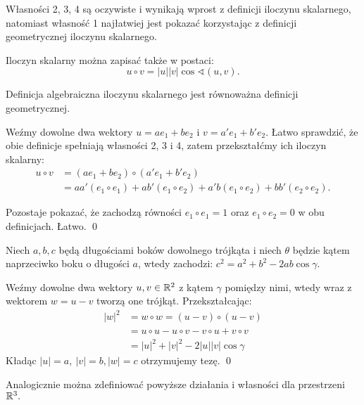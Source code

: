 Własności 2, 3, 4 są oczywiste i wynikają wprost z definicji iloczynu skalarnego, natomiast własność 1 najłatwiej jest
pokazać korzystając z definicji geometrycznej iloczynu skalarnego.
    
\begin{df}[geometryczna] 
Iloczyn skalarny można zapisać także w postaci: $$u \circ v = |u||v|\cos\sphericalangle(u, v).$$ \end{df}
    
\begin{tw} Definicja algebraiczna iloczynu skalarnego jest równoważna definicji geometrycznej. \end{tw}
    
\begin{dd}
    Weźmy dowolne dwa wektory $u = ae_1 + be_2$ i $v = a'e_1 + b'e_2$. Łatwo sprawdzić, że obie definicje spełniają
    własności 2, 3 i 4, zatem przekształćmy ich iloczyn skalarny:
    \begin{align*}u \circ v &= (ae_1 + be_2) \circ (a'e_1 + b'e_2) \\
                            &= aa'(e_1 \circ e_1) + ab'(e_1 \circ e_2) + 
                               a'b(e_1 \circ e_2) + bb'(e_2 \circ e_2).
    \end{align*}
    
    Pozostaje pokazać, że zachodzą równości $e_1 \circ e_1 = 1$ oraz $e_1 \circ e_2 = 0$ w obu definicjach. Łatwo. \qed
\end{dd}
    
\begin{tw}[cosinusów]
Niech $a,b,c$ będą długościami boków dowolnego trójkąta i niech $\theta$ będzie kątem naprzeciwko boku o długości $a$, wtedy zachodzi: $c^2 = a^2 + b^2 - 2ab\cos\gamma.$
\end{tw}
    
\begin{dd}
Weźmy dowolne dwa wektory $u,v\in\mathbb{R}^2$ z kątem $\gamma$ pomiędzy nimi, wtedy wraz z wektorem $w=u-v$ tworzą one trójkąt. Przekształcając: 
\begin{align*} |w|^2 &= w \circ w = (u-v)\circ(u-v) \\ 
                &= u \circ u - u \circ v - v \circ u + v \circ v \\ 
                &= |u|^2 + |v|^2 - 2|u||v|\cos\gamma 
\end{align*}
Kładąc $|u|=a,\ |v|=b, |w|=c$ otrzymujemy tezę. \qed
\end{dd}
    
Analogicznie można zdefiniować powyższe działania i własności dla przestrzeni $\mathbb{R}^3.$
    
